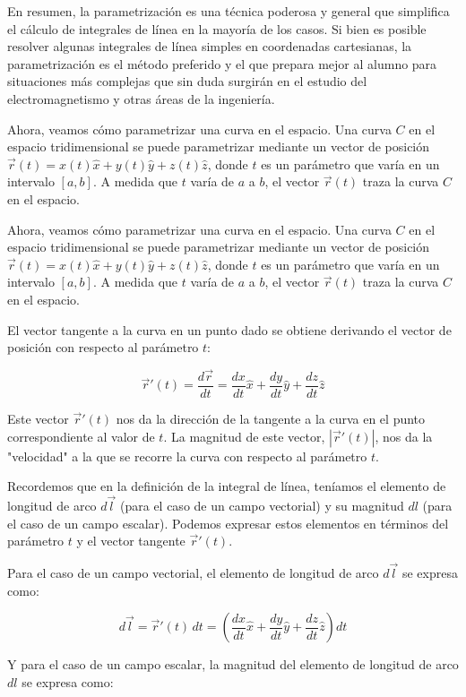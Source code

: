 \documentclass{article}
\begin{document}
En resumen, la parametrización es una técnica poderosa y general que simplifica el cálculo de integrales de línea en la mayoría de los casos. Si bien es posible resolver algunas integrales de línea simples en coordenadas cartesianas, la parametrización es el método preferido y el que prepara mejor al alumno para situaciones más complejas que sin duda surgirán en el estudio del electromagnetismo y otras áreas de la ingeniería.

Ahora, veamos cómo parametrizar una curva en el espacio. Una curva $C$ en el espacio tridimensional se puede parametrizar mediante un vector de posición $\vec{r}(t) = x(t)\hat{x} + y(t)\hat{y} + z(t)\hat{z}$, donde $t$ es un parámetro que varía en un intervalo $[a, b]$. A medida que $t$ varía de $a$ a $b$, el vector $\vec{r}(t)$ traza la curva $C$ en el espacio.

Ahora, veamos cómo parametrizar una curva en el espacio. Una curva $C$ en el espacio tridimensional se puede parametrizar mediante un vector de posición $\vec{r}(t) = x(t)\hat{x} + y(t)\hat{y} + z(t)\hat{z}$, donde $t$ es un parámetro que varía en un intervalo $[a, b]$. A medida que $t$ varía de $a$ a $b$, el vector $\vec{r}(t)$ traza la curva $C$ en el espacio.

El vector tangente a la curva en un punto dado se obtiene derivando el vector de posición con respecto al parámetro $t$:

\[
\vec{r}'(t) = \frac{d\vec{r}}{dt} = \frac{dx}{dt}\hat{x} + \frac{dy}{dt}\hat{y} + \frac{dz}{dt}\hat{z}
\]

Este vector $\vec{r}'(t)$ nos da la dirección de la tangente a la curva en el punto correspondiente al valor de $t$. La magnitud de este vector, $|\vec{r}'(t)|$, nos da la "velocidad" a la que se recorre la curva con respecto al parámetro $t$.

Recordemos que en la definición de la integral de línea, teníamos el elemento de longitud de arco $d\vec{l}$ (para el caso de un campo vectorial) y su magnitud $dl$ (para el caso de un campo escalar). Podemos expresar estos elementos en términos del parámetro $t$ y el vector tangente $\vec{r}'(t)$.

Para el caso de un campo vectorial, el elemento de longitud de arco $d\vec{l}$ se expresa como:

\[
d\vec{l} = \vec{r}'(t) \, dt = \left(\frac{dx}{dt}\hat{x} + \frac{dy}{dt}\hat{y} + \frac{dz}{dt}\hat{z}\right) dt
\]

Y para el caso de un campo escalar, la magnitud del elemento de longitud de arco $dl$ se expresa como:
\end{document}
